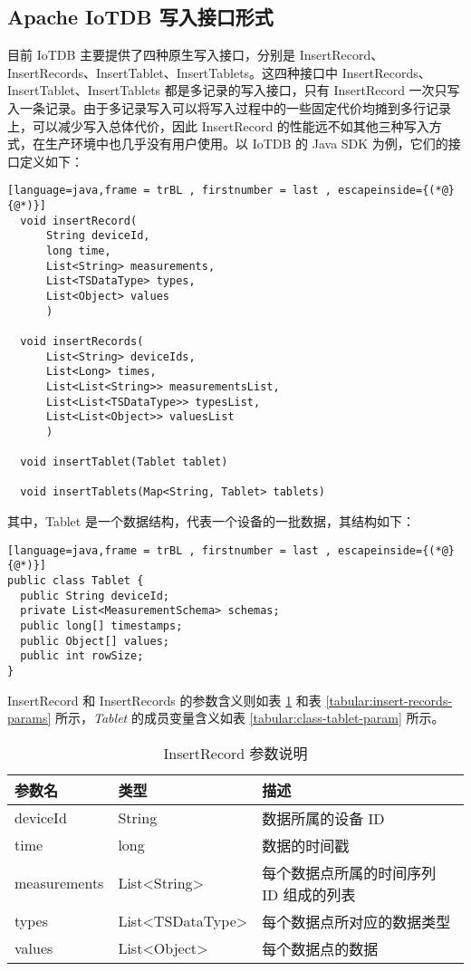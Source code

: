 \subsection{Apache IoTDB 写入接口形式}
目前 IoTDB 主要提供了四种原生写入接口，分别是 InsertRecord、InsertRecords、InsertTablet、InsertTablets。这四种接口中 InsertRecords、InsertTablet、InsertTablets 都是多记录的写入接口，只有 InsertRecord 一次只写入一条记录。由于多记录写入可以将写入过程中的一些固定代价均摊到多行记录上，可以减少写入总体代价\cite{bercken2001evaluation}，因此 InsertRecord 的性能远不如其他三种写入方式，在生产环境中也几乎没有用户使用。以 IoTDB 的 Java SDK 为例，它们的接口定义如下：
\begin{lstlisting}[language=java,frame = trBL , firstnumber = last , escapeinside={(*@}{@*)}]
  void insertRecord(
      String deviceId,
      long time,
      List<String> measurements,
      List<TSDataType> types,
      List<Object> values
      )

  void insertRecords(
      List<String> deviceIds, 
      List<Long> times, 
      List<List<String>> measurementsList, 
      List<List<TSDataType>> typesList, 
      List<List<Object>> valuesList
      )

  void insertTablet(Tablet tablet)

  void insertTablets(Map<String, Tablet> tablets)
\end{lstlisting}
其中，Tablet 是一个数据结构，代表一个设备的一批数据，其结构如下：
\begin{lstlisting}[language=java,frame = trBL , firstnumber = last , escapeinside={(*@}{@*)}]
public class Tablet {
  public String deviceId;
  private List<MeasurementSchema> schemas;
  public long[] timestamps;
  public Object[] values;
  public int rowSize;
}
\end{lstlisting}
InsertRecord 和 InsertRecords 的参数含义则如表 \ref{tabular:insert-record-params} 和表 \ref{tabular:insert-records-params} 所示，\emph{Tablet} 的成员变量含义如表 \ref{tabular:class-tablet-param} 所示。
\begin{table}
  \centering
  \caption{InsertRecord 参数说明}
  \begin{tabular}{lll}
    \toprule
    参数名 &  类型 & 描述 \\
    \midrule
    deviceId & String & 数据所属的设备 ID \\
    time & long & 数据的时间戳 \\
    measurements & List<String> & 每个数据点所属的时间序列 ID 组成的列表 \\
    types & List<TSDataType> & 每个数据点所对应的数据类型 \\
    values & List<Object> & 每个数据点的数据 \\
    \bottomrule
  \end{tabular}
  \label{tabular:insert-record-params}
\end{table}

